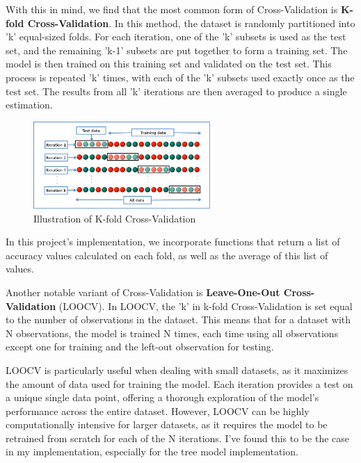 \documentclass[letterpaper,10pt]{article}
\begin{document}
With this in mind, we find that the most common form of Cross-Validation is \textbf{K-fold Cross-Validation}. In this method, the dataset is randomly partitioned into 'k' equal-sized folds. For each iteration, one of the 'k' subsets is used as the test set, and the remaining 'k-1' subsets are put together to form a training set. The model is then trained on this training set and validated on the test set. This process is repeated 'k' times, with each of the 'k' subsets used exactly once as the test set. The results from all 'k' iterations are then averaged to produce a single estimation. \par

\begin{figure}[ht]
    \centering
    \includegraphics[width=0.6\textwidth]{KFolds.png}
    \caption{Illustration of K-fold Cross-Validation}
    \label{fig:kfolds}
\end{figure}

In this project's implementation, we incorporate functions that return a list of accuracy values calculated on each fold, as well as the average of this list of values. \par

Another notable variant of Cross-Validation is \textbf{Leave-One-Out Cross-Validation} (LOOCV). In LOOCV, the 'k' in k-fold Cross-Validation is set equal to the number of observations in the dataset. This means that for a dataset with N observations, the model is trained N times, each time using all observations except one for training and the left-out observation for testing. \par

LOOCV is particularly useful when dealing with small datasets, as it maximizes the amount of data used for training the model. Each iteration provides a test on a unique single data point, offering a thorough exploration of the model's performance across the entire dataset. However, LOOCV can be highly computationally intensive for larger datasets, as it requires the model to be retrained from scratch for each of the N iterations. I've found this to be the case in my implementation, especially for the tree model implementation.
\end{document}
